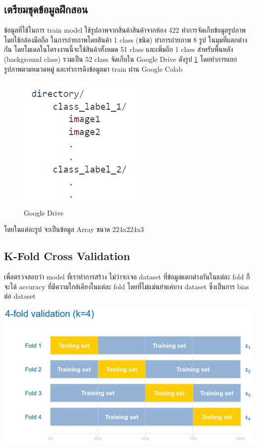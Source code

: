 \subsection{เตรียมชุดข้อมูลฝึกสอน}
ข้อมูลที่ใช้ในการ train model ใช้รูปภาพจากสินค้าสินค้าจากห้อง 422  ทำการจัดเก็บข้อมูลรูปภาพ โดยใช้กล้องมือถือ
ในการถ่ายภาพโดยสินค้า 1 class (ชนิด) ทำการถ่ายภาพ 8 รูป ในมุมที่แตกต่างกัน
โดยโมเดลในโครงงานนี้จะใช้สินค้าทั้งหมด 51 class และเพิ่มอีก 1 class สำหรับพื้นหลัง (background class)
รวมเป็น 52 class
จัดเก็บใน Google Drive ดังรูป  \ref{fig:Google Drive} โดยทำการแยก รูปภาพตามหมวดหมู่ และทำการดึงข้อมูลมา train ผ่าน Google Colab
\begin{figure}[h]
  \begin{center}

    \includegraphics[scale=0.4]{pic/model/st.png}
  \end{center}

  \caption[Google Drive]{Google Drive}
  \label{fig:Google Drive}
\end{figure}
โดยในแต่ละรูป จะเป็นข้อมูล Array ขนาด 224x224x3

\subsection{K-Fold Cross Validation}

เพื่อตรวจสอบว่า model ที่เราทำการสร้าง ไม่ว่าจะเจอ dataset ที่ข้อมูลแตกต่างกันในแต่ละ fold ก็จะได้ accuracy ที่มีความใกล้เคียงในแต่ละ fold โดยที่ไม่แม่นยำแค่บาง dataset ซึ่งเป็นการ bias ต่อ dataset


\begin{center}
  \includegraphics[scale=0.3]{pic/model/CrossValidation.png}\cite{CrossValidation}
\end{center}

